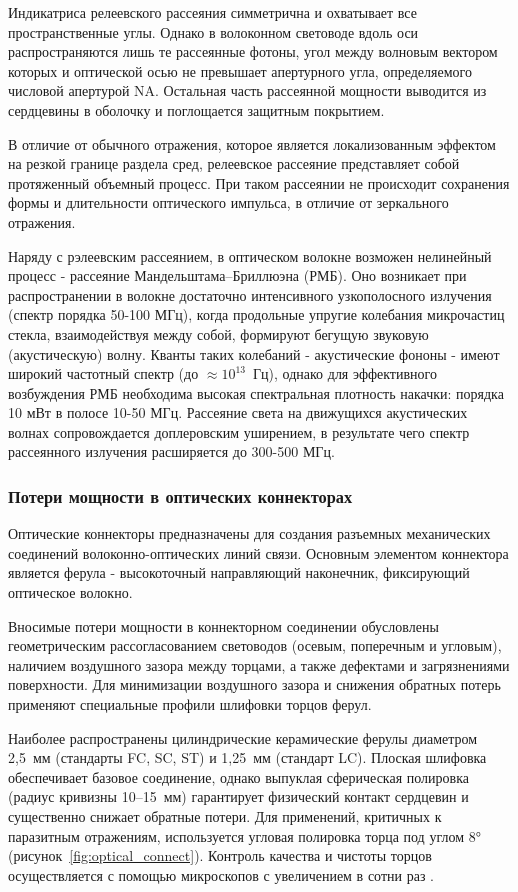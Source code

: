 \documentclass[14pt,a4paper]{extarticle}
\numberwithin{equation}{section}
\numberwithin{figure}{section}
\numberwithin{table}{section}
\begin{document}
Индикатриса релеевского рассеяния симметрична и охватывает все пространственные углы. Однако в волоконном световоде вдоль оси распространяются лишь те рассеянные фотоны, угол между волновым вектором которых и оптической осью не превышает апертурного угла, определяемого числовой апертурой $\mathrm{NA}$. Остальная часть рассеянной мощности выводится из сердцевины в оболочку и поглощается защитным покрытием.

В отличие от обычного отражения, которое является локализованным эффектом на резкой границе раздела сред, релеевское рассеяние представляет собой протяженный объемный процесс. При таком рассеянии не происходит сохранения формы и длительности оптического импульса, в отличие от зеркального отражения.


Наряду с рэлеевским рассеянием, в оптическом волокне возможен нелинейный процесс - рассеяние Мандельштама–Бриллюэна (РМБ). Оно возникает при распространении в волокне достаточно интенсивного узкополосного излучения (спектр порядка 50-100 МГц), когда продольные упругие колебания микрочастиц стекла, взаимодействуя между собой, формируют бегущую звуковую (акустическую) волну. Кванты таких колебаний - акустические фононы - имеют широкий частотный спектр (до $\approx 10^{13}$~Гц), однако для эффективного возбуждения РМБ необходима высокая спектральная плотность накачки: порядка 10 мВт в полосе 10-50 МГц. Рассеяние света на движущихся акустических волнах сопровождается доплеровским уширением, в результате чего спектр рассеянного излучения расширяется до 300-500 МГц. 

\subsubsection{Потери мощности в оптических коннекторах}

Оптические коннекторы предназначены для создания разъемных механических соединений волоконно-оптических линий связи. Основным элементом коннектора является ферула - высокоточный направляющий наконечник, фиксирующий оптическое волокно. 

Вносимые потери мощности в коннекторном соединении обусловлены геометрическим рассогласованием световодов (осевым, поперечным и угловым), наличием воздушного зазора между торцами, а также дефектами и загрязнениями поверхности. Для минимизации воздушного зазора и снижения обратных потерь применяют специальные профили шлифовки торцов ферул.

Наиболее распространены цилиндрические керамические ферулы диаметром 2{,}5~мм (стандарты FC, SC, ST) и 1{,}25~мм (стандарт LC). Плоская шлифовка обеспечивает базовое соединение, однако выпуклая сферическая полировка (радиус кривизны 10--15~мм) гарантирует физический контакт сердцевин и существенно снижает обратные потери. Для применений, критичных к паразитным отражениям, используется угловая полировка торца под углом 8°(рисунок~\ref{fig:optical_connect}). Контроль качества и чистоты торцов осуществляется с помощью микроскопов с увеличением в сотни раз .
\end{document}
